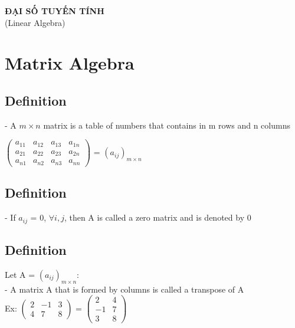 \documentclass[12pt]{article}
\begin{document}
\begin{center}
\textbf{ĐẠI SỐ TUYẾN TÍNH}\\
(Linear Algebra)
\end{center}
\section{Matrix Algebra}
\subsection{Definition}
- A $m \times n$ matrix is a table of numbers that contains in m rows and n columns
\begin{center}
$\begin{pmatrix}
	a_{11} & a_{12} & a_{13} & a_{1n} \\
	a_{21} & a_{22} & a_{23} & a_{2n} \\
	a_{n1} & a_{n2} & a_{n3} & a_{nn}
\end{pmatrix}$
= $(a_{ij})_{m \times n}$
\end{center}
\subsection{Definition}
- If $a_{ij}$ = 0, $\forall i,j$, then A is called a zero matrix and is denoted by 0
\subsection{Definition}
Let A = $(a_{ij})_{m \times n}$:\\
- A matrix A that is formed by columns is called a transpose of A\\
Ex:
$\begin{pmatrix}
	2 & -1 & 3 \\
	4 &  7 & 8
\end{pmatrix}$
=
$\begin{pmatrix}
	 2 & 4 \\
	-1 & 7 \\
	 3 & 8
\end{pmatrix}$
\end{document}

